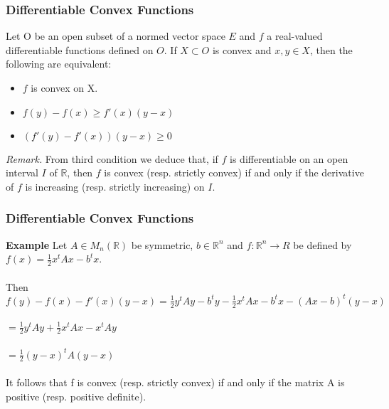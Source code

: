 \documentclass{beamer}
\newcommand{\R}{\mathbb{R}}
\begin{document}
\begin{frame}
\frametitle{Differentiable Convex Functions}
Let O be an open subset of a normed vector space $E$ and $f$ a real-valued differentiable functions defined on $O$. If $X \subset O$ is convex and $x, y \in X$, then the following are equivalent:\\
\begin{itemize}
\item $f$ is convex on X.
\item $f(y) - f(x) \geq f'(x)(y-x)$
\item $ (f'(y) - f'(x))(y-x) \geq 0$
\end{itemize}

\textit{Remark.} From third condition we deduce that, if $f$ is differentiable on
an open interval $I$ of $\R$, then $f$ is convex (resp. strictly convex) if and only if the
derivative of $f$ is increasing (resp. strictly increasing) on $I$.


\end{frame}


\begin{frame}
\frametitle{Differentiable Convex Functions}

\textbf{Example}
Let $A \in M_n(\R)$ be symmetric, $b \in \R^n$ and $f:\R^n \to R$ be defined by \\
\hspace{3cm} $f(x) = \frac{1}{2} x^t A x - b^t x$. \\~\\

Then $f(y) - f(x) - f'(x)(y-x) = \frac{1}{2} y^t A y - b^t y - \frac{1}{2} x^t A x - b^t x  - (Ax - b)^t (y-x)$\\~\\

\hspace{4cm} $= \frac{1}{2} y^t A y + \frac{1}{2} x^t A x -x^tAy$\\~\\


\hspace{4cm} $ = \frac{1}{2} (y-x)^t A (y-x)$ \\~\\

It follows that f is convex (resp. strictly convex) if and only if the matrix A is
positive (resp. positive definite). 

\end{frame}
\end{document}

